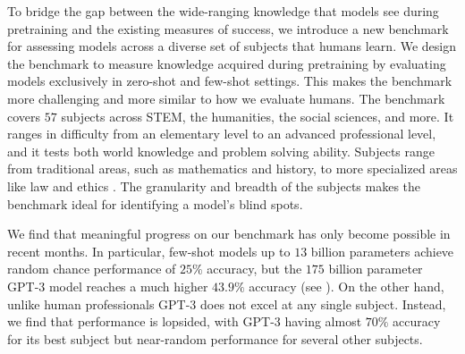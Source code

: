 
To bridge the gap between the wide-ranging knowledge that models see during pretraining and the existing measures of success,
we introduce a new benchmark for assessing models across a diverse set of subjects that humans learn.
We design the benchmark to measure knowledge acquired during pretraining by evaluating models exclusively in zero-shot and few-shot settings. This makes the benchmark more challenging and more similar to how we evaluate humans.
The benchmark covers $57$ subjects across STEM, the humanities, the social sciences, and more. It ranges in difficulty from an elementary level to an advanced professional level, and it tests both world knowledge and problem solving ability.
Subjects range from traditional areas, such as mathematics and history, to more specialized areas like law and ethics \citep{hendrycks2020ethicsdataset}.
The granularity and breadth of the subjects makes the benchmark ideal for identifying a model's blind spots. 



We find that meaningful progress on our benchmark has only become possible in recent months. In particular, few-shot models up to $13$ billion parameters \citep{brown2020gpt3} achieve random chance performance of $25\%$ accuracy, but the $175$ billion parameter GPT-3 model reaches a much higher $43.9\%$ accuracy (see ). 
On the other hand, unlike human professionals GPT-3 does not excel at any single subject.
Instead, we find that performance is lopsided, with GPT-3 having almost $70\%$ accuracy for its best subject but near-random performance for several other subjects.



